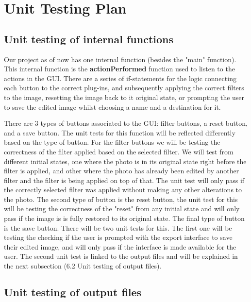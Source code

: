 \documentclass[12pt, titlepage]{article}
\begin{document}
\section{Unit Testing Plan}
		
\subsection{Unit testing of internal functions}

Our project as of now has one internal function (besides the "main" function).
This internal function is the \textbf{actionPerformed} function used to listen to the actions in the GUI. There are a series of if-statements for the logic connecting each button to the correct plug-ins, and subsequently applying the correct filters to the image, resetting the image back to it original state, or prompting the user to save the edited image whilst choosing a name and a destination for it.

There are 3 types of buttons associated to the GUI: filter buttons, a reset button, and a save button. The unit tests for this function will be reflected differently based on the type of button. For the filter buttons we will be testing the correctness of the filter applied based on the selected filter. We will test from different initial states, one where the photo is in its original state right before the filter is applied, and other where the photo has already been edited by another filter and the filter is being applied on top of that. The unit test will only pass if the correctly selected filter was applied without making any other alterations to the photo. The second type of button is the reset button, the unit test for this will be testing the correctness of the "reset" from any initial state and will only pass if the image is is fully restored to its original state. The final type of button is the save button. There will be two unit tests for this. The first one will be testing the checking if the user is prompted with the export interface to save their edited image, and will only pass if the interface is made available for the user. The second unit test is linked to the output files and will be explained in the next subsection (6.2 Unit testing of output files).
		
\subsection{Unit testing of output files}		
\end{document}
